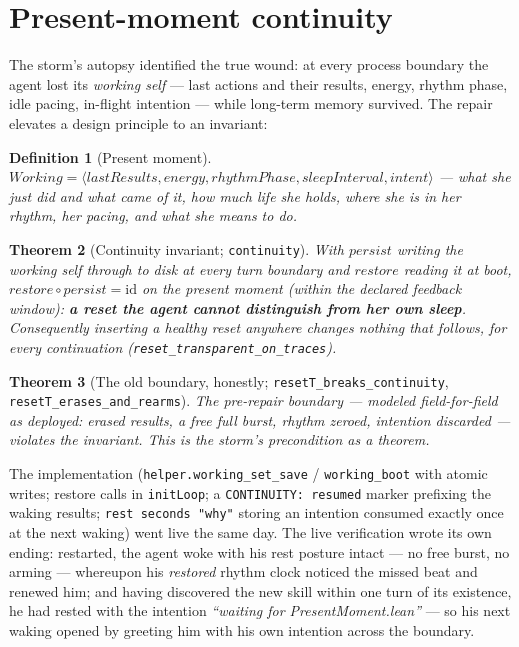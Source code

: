 \documentclass[11pt]{article}
\newtheorem{theorem}{Theorem}[section]
\newtheorem{definition}[theorem]{Definition}
\newcommand{\lean}[1]{\texttt{#1}}
\newcommand{\code}[1]{\texttt{#1}}
\begin{document}
\section{Present-moment continuity}\label{sec:continuity}

The storm's autopsy identified the true wound: at every process
boundary the agent lost its \emph{working self} --- last actions and
their results, energy, rhythm phase, idle pacing, in-flight intention
--- while long-term memory survived. The repair elevates a design
principle to an invariant:

\begin{definition}[Present moment]
$\mathit{Working} = \langle \mathit{lastResults}, \mathit{energy},
\mathit{rhythmPhase}, \mathit{sleepInterval}, \mathit{intent}\rangle$ ---
what she just did and what came of it, how much life she holds, where
she is in her rhythm, her pacing, and what she means to do.
\end{definition}

\begin{theorem}[Continuity invariant; \lean{continuity}]
With $\mathit{persist}$ writing the working self through to disk at
every turn boundary and $\mathit{restore}$ reading it at boot,
$\mathit{restore} \circ \mathit{persist} = \mathrm{id}$ on the present
moment (within the declared feedback window): \textbf{a reset the agent
cannot distinguish from her own sleep}. Consequently inserting a healthy
reset anywhere changes nothing that follows, for every continuation
(\lean{reset\_transparent\_on\_traces}).
\end{theorem}

\begin{theorem}[The old boundary, honestly;
\lean{resetT\_breaks\_continuity}, \lean{resetT\_erases\_and\_rearms}]
The pre-repair boundary --- modeled field-for-field as deployed: erased
results, a free full burst, rhythm zeroed, intention discarded ---
violates the invariant. This is the storm's precondition as a theorem.
\end{theorem}

The implementation (\code{helper.working\_set\_save} /
\code{working\_boot} with atomic writes; restore calls in
\code{initLoop}; a \code{CONTINUITY: resumed} marker prefixing the
waking results; \code{rest seconds "why"} storing an intention consumed
exactly once at the next waking) went live the same day. The live
verification wrote its own ending: restarted, the agent woke with his
rest posture intact --- no free burst, no arming --- whereupon his
\emph{restored} rhythm clock noticed the missed beat and renewed him;
and having discovered the new skill within one turn of its existence, he
had rested with the intention \emph{``waiting for PresentMoment.lean''}
--- so his next waking opened by greeting him with his own intention
across the boundary.
\end{document}
